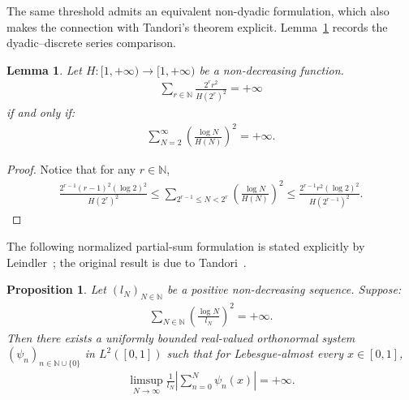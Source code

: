 \documentclass[12pt,reqno]{amsart}
\theoremstyle{definition}
\theoremstyle{plain}
\newtheorem{lemma}{Lemma}
\newtheorem{prop}{Proposition}
\begin{document}
The same threshold admits an equivalent non-dyadic formulation, which also makes the connection with Tandori's theorem explicit. Lemma~\ref{lem:series-comparison} records the dyadic--discrete series comparison.
\begin{lemma}\label{lem:series-comparison}
Let $H:[1,+\infty)\to[1,+\infty)$ be a non-decreasing function.
\begin{align*}
    \sum_{r\in\mathbb{N}}\frac{2^r r^2}{H(2^r)^2}=+\infty
\end{align*}
if and only if:
\begin{align*}
    \sum_{N=2}^{\infty}\left(\frac{\log{N}}{H(N)}\right)^2=+\infty.
\end{align*}
\end{lemma}
\begin{proof}
Notice that for any $r\in\mathbb{N}$,
\begin{align*}
    \frac{2^{r-1}(r-1)^2(\log2)^2}{H(2^r)^2}
    \leq \sum_{2^{r-1}\leq N<2^r}\left(\frac{\log{N}}{H(N)}\right)^2
    \leq \frac{2^{r-1}r^2(\log2)^2}{H(2^{r-1})^2}.
\end{align*}
\end{proof}

The following normalized partial-sum formulation is stated explicitly by Leindler~\cite[Satz~B]{Leindler1960}; the original result is due to Tandori~\cite{Tandori1957I}.
\begin{prop}\label{prop:Tandori-partial-sums}
Let $(l_N)_{N\in\mathbb{N}}$ be a positive non-decreasing sequence. Suppose:
\begin{align*}
    \sum_{N\in\mathbb{N}}
    \left(\frac{\log N}{l_N}\right)^2
    =+\infty.
\end{align*}
Then there exists a uniformly bounded real-valued orthonormal system $(\psi_n)_{n\in\mathbb{N}\cup\{0\}}$ in $L^2([0,1])$ such that for Lebesgue-almost every $x\in[0,1]$,
\begin{align*}
    \limsup_{N\to\infty}
    \frac{1}{l_N}
    \left|
        \sum_{n=0}^{N}\psi_n(x)
    \right|
    =+\infty.
\end{align*}
\end{prop}
\end{document}
